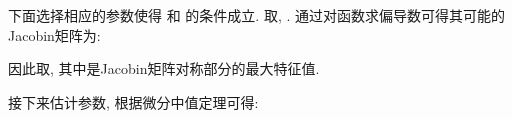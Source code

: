         下面选择相应的参数使得 和 的条件成立.
        取, . 通过对函数求偏导数可得其可能的Jacobin矩阵为:
        \begin{comment}
        \left(
              \begin{array}{ccc}
                3.0318 & 9.78 & 0 \\
                1 & -1 & 1 \\
                0 & -14.97 & 0 \\
              \end{array}
            \right),~~~~
        \left(
              \begin{array}{ccc}
                -2.445 & 9.78 & 0 \\
                1 & -1 & 1 \\
                0 & -14.97 & 0 \\
              \end{array}
            \right).
        \end{comment}
        因此取, 其中是Jacobin矩阵对称部分的最大特征值.
\begin{comment}[!htb]
\begin{minipage}[t]{0.48\linewidth}
\centering
\texttt{[image: nonlinear/Totallerror1.eps]}
\caption{在连续监控激发规则CRS和激发规则CRE下, 网络总误差轨道随时间变化情况.}\label{Totallerror1}
\end{minipage}~~
\begin{minipage}[t]{0.48\linewidth}
\centering
\texttt{[image: nonlinear/Totallerror2.eps]}
\caption{在离散监控激发规则DRS和激发规则DRE下, 网络总误差轨道随时间变化情况.}\label{Totallerror2}
\end{minipage}
\end{comment}
\begin{comment}[!htb]
\begin{minipage}[t]{0.48\linewidth}
\centering
\texttt{[image: nonlinear/triggertime.eps]}
\caption{连续监控和离散监控四种激发规则每个节点平均激发次数.}\label{tritime}
\end{minipage}~~
\begin{minipage}[t]{0.48\linewidth}
\centering
\texttt{[image: nonlinear/Vt.eps]}
\caption{Lyapunov-Krasovskii函数.}\label{Vt}
\end{minipage}
\end{comment}
        接下来估计参数, 根据微分中值定理可得:
        \begin{comment}
        \quad(f(u)f(v))^\top((f(u)-f(v)))
        &=(J(\varsigma)(u-v))^\top(J(\varsigma)(u-v))\\
        &=(u-v)^\top J(\varsigma)^\top J(\varsigma)(u-v)\\
        &\leq\lambda_{max}(J(\varsigma)^\top J(\varsigma))(u-v)^\top(u-v)\\
        &\leq17.9826^2(u-v)^\top(u-v)
        \end{comment}

